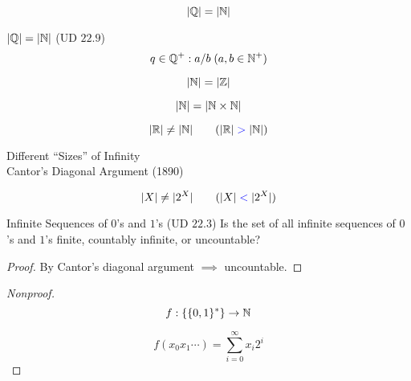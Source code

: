 \begin{frame}{}
  \begin{theorem}[$\aleph_0$ (1874)]
    \[
      |\mathbb{Q}| = |\mathbb{N}|
    \]
  \end{theorem}

  \pause
  \begin{exampleblock}{$|\mathbb{Q}| = |\mathbb{N}|$ (UD $22.9$)}
    \[
      q \in \mathbb{Q}^{+}: a / b \; (a,b \in \mathbb{N}^{+})
    \]
  \end{exampleblock}
\end{frame}

\begin{frame}{}
  \[
    |\mathbb{N}| = |\mathbb{Z}|
  \]

  \[
    |\mathbb{N}| = |\mathbb{N} \times \mathbb{N}|
  \]
\end{frame}

\begin{frame}{}
  \begin{theorem}
    \[
      |\mathbb{R}| \neq |\mathbb{N}| \qquad (|\mathbb{R}| \;\textcolor{blue}{>}\; |\mathbb{N}|)
    \]
  \end{theorem}

  \pause
  \vspace{0.60cm}
  \begin{center}
    Different ``Sizes'' of Infinity \\[10pt] \pause
    Cantor's Diagonal Argument (1890)
  \end{center}

  \pause
  \vspace{0.50cm}
  \begin{theorem}
    \[
      |X| \neq |2^{X}| \qquad (|X| \;\textcolor{blue}{<}\; |2^{X}|)
    \]
  \end{theorem}
\end{frame}

\begin{frame}{}
  \begin{exampleblock}{Infinite Sequences of $0$'s and $1$'s (UD $22.3$)}
    Is the set of all infinite sequences of $0$'s and $1$'s finite,
    countably infinite, or uncountable?
  \end{exampleblock}

  \pause
  \vspace{0.50cm}
  \begin{proof}
    By Cantor's diagonal argument $\implies$ uncountable.
  \end{proof}

  \pause
  \vspace{0.30cm}
  \begin{proof}[Nonproof]
    \[
      f: \{\{0,1\}^{\ast}\} \to \mathbb{N}
    \]

    \[
      f(x_0 x_1 \cdots) = \sum_{i=0}^{\infty} x_i 2^{i}
    \]
  \end{proof}
\end{frame}

